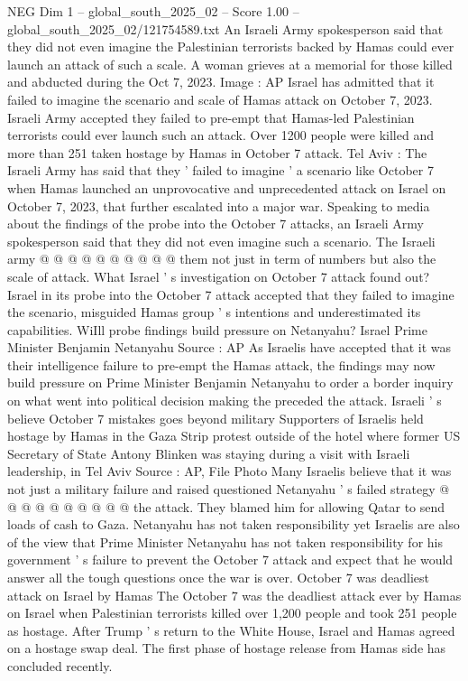 \begin{textsample}{NEG Dim 1 – global\_south\_2025\_02 – Score 1.00 – global\_south\_2025\_02/121754589.txt}  \label{ex:f1_neg_036}
An Israeli Army spokesperson said that they did not even imagine the Palestinian terrorists backed by Hamas could ever launch an attack of such a scale.
A woman grieves at a memorial for those killed and abducted during the Oct 7, 2023.
Image : AP Israel has admitted that it failed to imagine the scenario and scale of Hamas attack on October 7, 2023.
Israeli Army accepted they failed to pre-empt that Hamas-led Palestinian terrorists could ever launch such an attack.
Over 1200 people were killed and more than 251 taken hostage by Hamas in October 7 attack.
Tel Aviv : The Israeli Army has said that they ' failed to imagine ' a scenario like October 7 when Hamas launched an unprovocative and unprecedented attack on Israel on October 7, 2023, that further escalated into a major war.
Speaking to media about the findings of the probe into the October 7 attacks, an Israeli Army spokesperson said that they did not even imagine such a scenario.
The Israeli army @ @ @ @ @ @ @ @ @ @ them not just in term of numbers but also the scale of attack.
What Israel ' s investigation on October 7 attack found out?
Israel in its probe into the October 7 attack accepted that they failed to imagine the scenario, misguided Hamas group ' s intentions and underestimated its capabilities.
WiIll probe findings build pressure on Netanyahu?
Israel Prime Minister Benjamin Netanyahu Source : AP As Israelis have accepted that it was their intelligence failure to pre-empt the Hamas attack, the findings may now build pressure on Prime Minister Benjamin Netanyahu to order a border inquiry on what went into political decision making the preceded the attack.
Israeli ' s believe October 7 mistakes goes beyond military Supporters of Israelis held hostage by Hamas in the Gaza Strip protest outside of the hotel where former US Secretary of State Antony Blinken was staying during a visit with Israeli leadership, in Tel Aviv Source : AP, File Photo Many Israelis believe that it was not just a military failure and raised questioned Netanyahu ' s failed strategy @ @ @ @ @ @ @ @ @ @ the attack.
They blamed him for allowing Qatar to send loads of cash to Gaza.
Netanyahu has not taken responsibility yet Israelis are also of the view that Prime Minister Netanyahu has not taken responsibility for his government ' s failure to prevent the October 7 attack and expect that he would answer all the tough questions once the war is over.
October 7 was deadliest attack on Israel by Hamas The October 7 was the deadliest attack ever by Hamas on Israel when Palestinian terrorists killed over 1,200 people and took 251 people as hostage.
After Trump ' s return to the White House, Israel and Hamas agreed on a hostage swap deal.
The first phase of hostage release from Hamas side has concluded recently.

\end{textsample}
